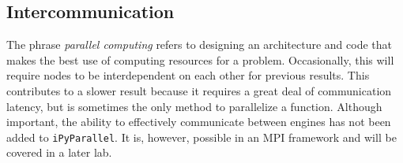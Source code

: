 \subsection*{Intercommunication}
The phrase \emph{parallel computing} refers to designing an architecture and code that makes the best use of computing resources for a problem.
Occasionally, this will require nodes to be interdependent on each other for previous results.
This contributes to a slower result because it requires a great deal of communication latency, but is sometimes the only method to parallelize a function.
Although important, the ability to effectively communicate between engines has not been added to \texttt{iPyParallel}.
It is, however, possible in an MPI framework and will be covered in a later lab.

%
%
%
%
%
